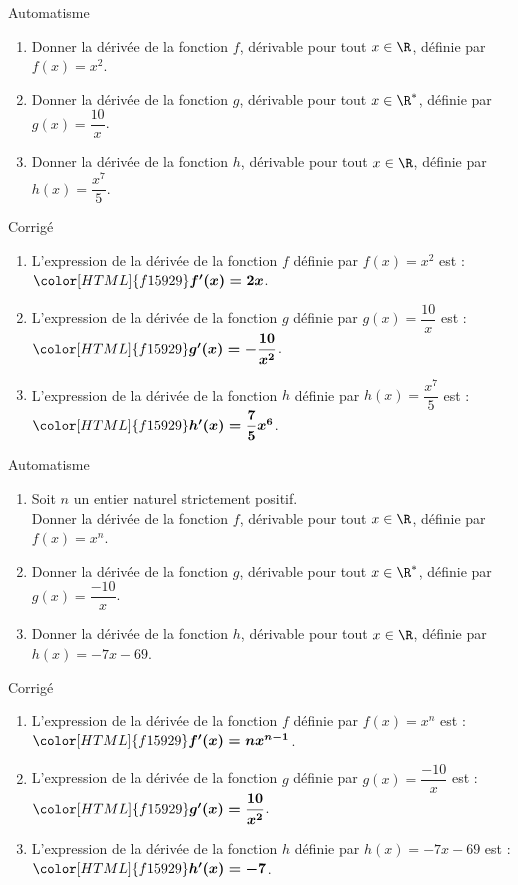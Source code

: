 \documentclass[a4paper,11pt,exos]{nsi} %
\newcounter{autNum}
\newcommand{\aut}[1]
{
	\addtocounter{autNum}{1}
	{\titlefont\color{UGLiBlue}\Large Automatisme\ \theautNum\ \normalsize{#1}}\smallskip	
}
\newcounter{corNum}
\newcommand{\cor}[1]
{
	\addtocounter{corNum}{1}
	{\titlefont\color{UGLiOrange}\Large Corrigé\ \thecorNum\ \normalsize{#1}}\smallskip	
}
\begin{document}
	\aut{}%
	\begin{enumerate}[]
		\item Donner la dérivée de la fonction $f$, dérivable pour tout $x\in\R$, définie par  $f(x)=x^2$.
		\item Donner la dérivée de la fonction $g$, dérivable pour tout $x\in\R^*$, définie par  $g(x)=\dfrac{10}{x}$.
		\item Donner la dérivée de la fonction $h$, dérivable pour tout $x\in\R$, définie par  $h(x)=\dfrac{x^{7}}{5}$.
	\end{enumerate}

	\cor{}
	\begin{enumerate}[]
		\item L'expression de la dérivée de la fonction $f$ définie par $f(x)=x^2$ est : ${\color[HTML]{f15929}\boldsymbol{f'(x)=2x}}$.
		\item L'expression de la dérivée de la fonction $g$ définie par $g(x)=\dfrac{10}{x}$ est : ${\color[HTML]{f15929}\boldsymbol{g'(x)=-\dfrac{10}{x^2}}}$.
		\item L'expression de la dérivée de la fonction $h$ définie par $h(x)=\dfrac{x^{7}}{5}$ est : ${\color[HTML]{f15929}\boldsymbol{h'(x)=\dfrac{7}{5}x^{6}}}$.
		\end{enumerate}

\aut{}%
	\begin{enumerate}[]
		\item Soit $n$ un entier naturel strictement positif.\\
		Donner la dérivée de la fonction $f$, dérivable pour tout $x\in\R$, définie par  $f(x)=x^n$.
		\item Donner la dérivée de la fonction $g$, dérivable pour tout $x\in\R^*$, définie par  $g(x)=\dfrac{-10}{x}$.
		\item Donner la dérivée de la fonction $h$, dérivable pour tout $x\in\R$, définie par  $h(x)=-7x-69$.
	\end{enumerate}

	\cor{}
	\begin{enumerate}[]
		\item L'expression de la dérivée de la fonction $f$ définie par $f(x)=x^n$ est : ${\color[HTML]{f15929}\boldsymbol{f'(x)=nx^{n - 1}}}$.
		\item L'expression de la dérivée de la fonction $g$ définie par $g(x)=\dfrac{-10}{x}$ est : ${\color[HTML]{f15929}\boldsymbol{g'(x)=\dfrac{10}{x^2}}}$.
		\item L'expression de la dérivée de la fonction $h$ définie par $h(x)=-7x-69$ est : ${\color[HTML]{f15929}\boldsymbol{h'(x)=-7}}$.\\

		\end{enumerate}
\end{document}
